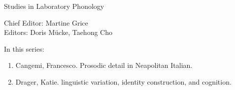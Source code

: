 
{\raggedleft{}}

\bigskip

{\large Studies in Laboratory Phonology}

\bigskip

Chief Editor:  Martine Grice%
\\
Editors:    Doris Mücke, %
    Taehong Cho %

\bigskip

In this series:

\begin{enumerate}
\item Cangemi, Francesco. Prosodic detail in Neapolitan Italian.
\item Drager, Katie. linguistic variation, identity construction, and cognition.
\end{enumerate}